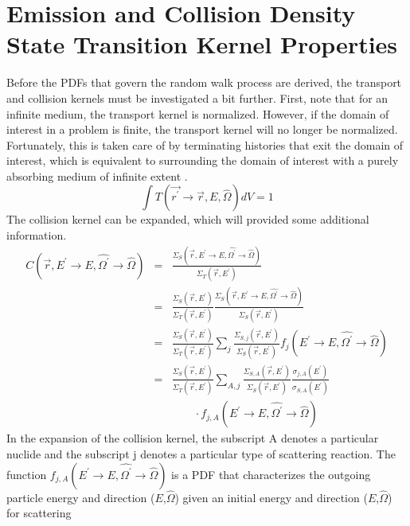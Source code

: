 \section{Emission and Collision Density State Transition Kernel Properties}
Before the PDFs that govern the random walk process are derived, the transport
and collision kernels must be investigated a bit further. First, note that
for an infinite medium, the transport kernel is normalized. However, if the
domain of interest in a problem is finite, the transport kernel will no longer
be normalized. Fortunately, this is taken care of by terminating histories 
that exit the domain of interest, which is equivalent to surrounding the domain
of interest with a purely absorbing medium of infinite extent 
\citep{irving_adjoint_1971}.
\begin{equation}
  \int T(\vec{r^{'}} \to \vec{r},E,\hat{\Omega})dV = 1
\end{equation}
The collision kernel can be expanded, which will provided some additional 
information. 
\begin{eqnarray}
  C(\vec{r},E^{'} \to E, \hat{\Omega^{'}} \to \hat{\Omega}) & = &
  \frac{\Sigma_S(\vec{r},E^{'} \to E,\hat{\Omega^{'}} \to \hat{\Omega})}
       {\Sigma_T(\vec{r},E^{'})} \nonumber \\
  \quad & = & \frac{\Sigma_S(\vec{r},E^{'})}{\Sigma_T(\vec{r},E^{'})}
  \frac{\Sigma_S(\vec{r},E^{'} \to E,\hat{\Omega^{'}} \to \hat{\Omega})}
       {\Sigma_S(\vec{r},E^{'})} \nonumber \\
  & = & \frac{\Sigma_S(\vec{r},E^{'})}{\Sigma_T(\vec{r},E^{'})} \sum_j
        \frac{\Sigma_{S,j}(\vec{r},E^{'})}{\Sigma_S(\vec{r},E^{'})}
        f_j(E^{'} \to E,\hat{\Omega^{'}} \to \hat{\Omega}) \nonumber\\
  & = & \frac{\Sigma_S(\vec{r},E^{'})}{\Sigma_T(\vec{r},E^{'})}
        \sum_{A,j} \frac{\Sigma_{S,A}(\vec{r},E^{'})}{\Sigma_S(\vec{r},E^{'})}  
        \frac{\sigma_{j,A}(E^{'})}{\sigma_{S,A}(E^{'})}  \\
        && \qquad \cdot
        f_{j,A}(E^{'} \to E,\hat{\Omega^{'}} \to \hat{\Omega}) \nonumber
\end{eqnarray}
In the expansion of the collision kernel, the subscript A denotes a particular
nuclide and the subscript j denotes a particular type of scattering reaction. 
The function 
$f_{j,A}(E^{'} \to E,\hat{\Omega^{'}} \to \hat{\Omega})$ is a PDF that 
characterizes the outgoing particle energy and direction ($E$,$\hat{\Omega}$) 
given an initial energy and direction ($E$,$\hat{\Omega}$) for scattering 
